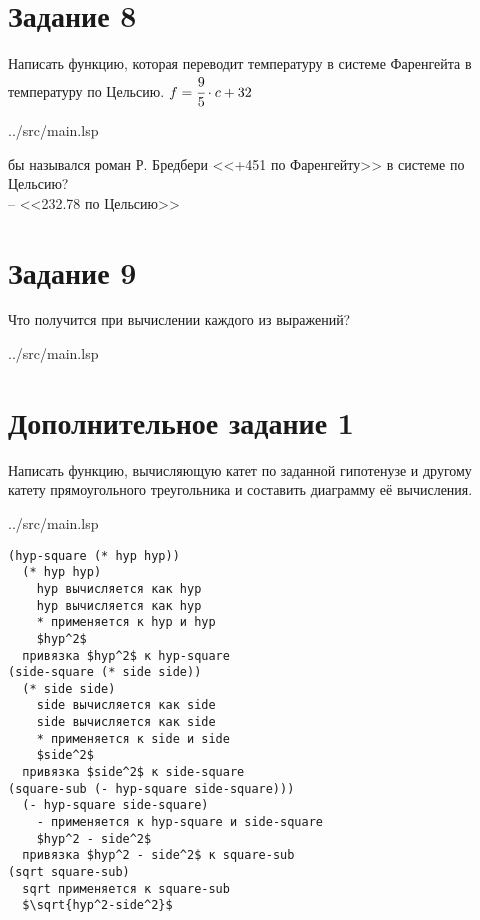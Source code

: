 \section*{Задание 8}

Написать функцию, которая переводит температуру в системе Фаренгейта в температуру по Цельсию. $f = \cfrac{9}{5}\cdot c + 32$

\begin{lstinputlisting}[
	caption={Задание 8},
	label={lst:t8},
	style={lsp},
	linerange={59-61},
	]{../src/main.lsp}
\end{lstinputlisting}

 бы назывался роман Р. Бредбери <<+451 по Фаренгейту>> в системе по Цельсию?\\
-- <<232.78 по Цельсию>>

\section*{Задание 9}

Что получится при вычислении каждого из выражений?

\begin{lstinputlisting}[
	caption={Задание 9},
	label={lst:t9},
	style={lsp},
	linerange={65-71},
	]{../src/main.lsp}
\end{lstinputlisting}

\section*{Дополнительное задание 1}

Написать функцию, вычисляющую катет по заданной гипотенузе и другому катету прямоугольного треугольника и составить диаграмму её вычисления. 

\begin{lstinputlisting}[
	caption={Дополнительное задание 1},
	label={lst:e1},
	style={lsp},
	linerange={74-79},
	]{../src/main.lsp}
\end{lstinputlisting}

\begin{lstlisting}[style={scheme}]
(hyp-square (* hyp hyp))
  (* hyp hyp)
    hyp вычисляется как hyp
    hyp вычисляется как hyp
    * применяется к hyp и hyp
    $hyp^2$
  привязка $hyp^2$ к hyp-square
(side-square (* side side))
  (* side side)
    side вычисляется как side
    side вычисляется как side
    * применяется к side и side
    $side^2$
  привязка $side^2$ к side-square
(square-sub (- hyp-square side-square)))
  (- hyp-square side-square)
    - применяется к hyp-square и side-square
    $hyp^2 - side^2$
  привязка $hyp^2 - side^2$ к square-sub
(sqrt square-sub)
  sqrt применяется к square-sub
  $\sqrt{hyp^2-side^2}$
\end{lstlisting}


